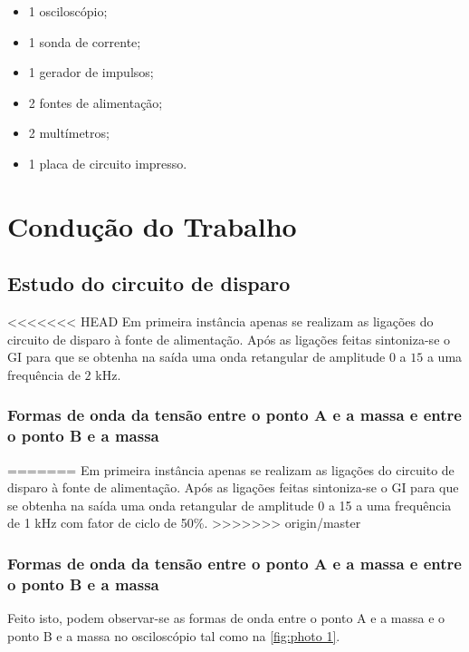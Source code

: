 \documentclass[a4paper,11pt]{article}
\numberwithin{equation}{section}
\begin{document}
\begin{itemize}
	\item 1 osciloscópio;
	\vspace{-2mm}	
	\item 1 sonda de corrente;
	\vspace{-2mm}	
	\item 1 gerador de impulsos;
	\vspace{-2mm}	
	\item 2 fontes de alimentação;
	\vspace{-2mm}	
	\item 2 multímetros;
	\vspace{-2mm}	
	\item 1 placa de circuito impresso.
\end{itemize}

\pagebreak

\section{Condução do Trabalho}

\subsection{Estudo do circuito de disparo}

<<<<<<< HEAD
Em primeira instância apenas se realizam as ligações do circuito de disparo à fonte de alimentação. Após as ligações feitas sintoniza-se o GI para que se obtenha na saída uma onda retangular de amplitude $0$ a $15$ a uma frequência de $2$ kHz.


\subsubsection{Formas de onda da tensão entre o ponto A e a massa e entre o ponto B e a massa}
=======
Em primeira instância apenas se realizam as ligações do circuito de disparo à fonte de alimentação. Após as ligações feitas sintoniza-se o GI para que se obtenha na saída uma onda retangular de amplitude 0 a 15 a uma frequência de 1 kHz com fator de ciclo de 50\%.
>>>>>>> origin/master

\subsubsection{Formas de onda da tensão entre o ponto A e a massa e entre o ponto B e a massa}

Feito isto, podem observar-se as formas de onda entre o ponto A e a massa e o ponto B e a massa no osciloscópio tal como na \autoref{fig:photo 1}.
\end{document}
